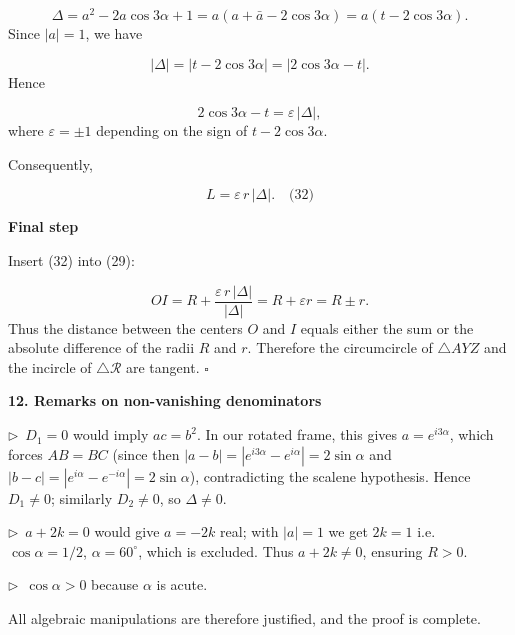\documentclass{llmxive}
\providecommand{\solutionheading}[1]{\par\smallskip\noindent\textbf{#1}\par}
\providecommand{\compactbullet}[1]{\par\noindent$\triangleright$~#1\par}
\begin{document}
\[
\Delta = a^2 - 2a\cos3\alpha + 1 = a(a + \bar a - 2\cos3\alpha) = a(t - 2\cos3\alpha).
\]
Since \(|a|=1\), we have\par
\[
|\Delta| = |t - 2\cos3\alpha| = |2\cos3\alpha - t|.
\]
Hence\par
\[
2\cos3\alpha - t = \varepsilon\, |\Delta|,
\]
where \(\varepsilon = \pm 1\) depending on the sign of \(t - 2\cos3\alpha\).\par
Consequently,\par
\[
L = \varepsilon\, r\, |\Delta|. \quad\text{(32)}
\]
\solutionheading{Final step}
Insert (32) into (29):\par
\[
OI = R + \frac{\varepsilon\, r\, |\Delta|}{|\Delta|} = R + \varepsilon r = R \pm r.
\]
Thus the distance between the centers \(O\) and \(I\) equals either the sum or the absolute difference of the radii \(R\) and \(r\). Therefore the circumcircle of \(\triangle AYZ\) and the incircle of \(\triangle\mathcal{R}\) are tangent. \(\square\)\par
\smallskip
\solutionheading{12. Remarks on non-vanishing denominators}
\compactbullet{\(D_1 = 0\) would imply \(ac = b^2\). In our rotated frame, this gives \(a = e^{i3\alpha}\), which forces \(AB = BC\) (since then \(|a-b| = |e^{i3\alpha}-e^{i\alpha}| = 2\sin\alpha\) and \(|b-c| = |e^{i\alpha}-e^{-i\alpha}| = 2\sin\alpha\)), contradicting the scalene hypothesis. Hence \(D_1 \neq 0\); similarly \(D_2 \neq 0\), so \(\Delta \neq 0\).}
\compactbullet{\(a+2k = 0\) would give \(a = -2k\) real; with \(|a|=1\) we get \(2k=1\) i.e. \(\cos\alpha = 1/2\), \(\alpha = 60^\circ\), which is excluded. Thus \(a+2k \neq 0\), ensuring \(R > 0\).}
\compactbullet{\(\cos\alpha > 0\) because \(\alpha\) is acute.}
All algebraic manipulations are therefore justified, and the proof is complete.\par
\par
\end{document}
